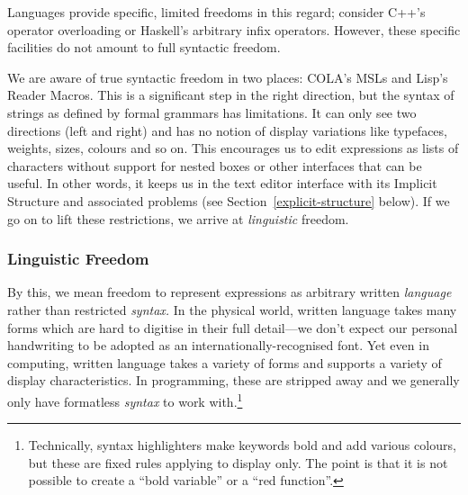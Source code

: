 \documentclass[ twoside,openright,titlepage,numbers=noenddot,headinclude,footinclude,cleardoublepage=empty,abstract=on,
                BCOR=5mm,paper=a4,fontsize=11pt
                ]{scrreprt}
\newcommand{\joel}[1]{}
\theoremstyle{definition}
\begin{document}
\joel{
It could be objected that using `+` instead of `.add()` is already supported in some languages, such as C++ with its operator overloading. We would then point to the `×` Unicode character and ask for a language that permits this infix operator. We might be met with Haskell, famous for its arbitrary user-defined infix operators that may include Unicode symbols. In this case we would point at the juxtaposition of the two parts of the first term to denote multiplication. Are there any languages that permit overloading of whitespace as an infix operator? Supposing there were, there would be other cases for other problem domains where piecemeal allowances in what can be overloaded is not enough. Custom glyphs or even the symbols available in \LaTeX{} but not in Unicode could suffice as an example, but we will not belabour this further.}

Languages provide specific, limited freedoms in this regard; consider
C++'s operator overloading or Haskell's arbitrary infix operators.
However, these specific facilities do not amount to full syntactic
freedom.

We are aware of true syntactic freedom in two places: \ac{COLA}'s
\acfp{MSL} and Lisp's Reader Macros. This is a significant step in the
right direction, but the syntax of strings as defined by formal grammars
has limitations. It can only see two directions (left and right) and has
no notion of display variations like typefaces, weights, sizes, colours
and so on. This encourages us to edit expressions as lists of characters
without support for nested boxes or other interfaces that can be useful.
In other words, it keeps us in the text editor interface with its
Implicit Structure and associated problems (see
Section~\ref{explicit-structure} below). If we go on to lift these
restrictions, we arrive at \emph{linguistic} freedom.

\hypertarget{linguistic-freedom}{\subsubsection{Linguistic Freedom}\label{linguistic-freedom}}

By this, we mean freedom to represent expressions as arbitrary written
\emph{language} rather than restricted \emph{syntax.} In the physical
world, written language takes many forms which are hard to digitise in
their full detail---we don't expect our personal handwriting to be
adopted as an internationally-recognised font. Yet even in computing,
written language takes a variety of forms and supports a variety of
display characteristics. In programming, these are stripped away and we
generally only have formatless \emph{syntax} to work with.\footnote{Technically,
  syntax highlighters make keywords bold and add various colours, but
  these are fixed rules applying to display only. The point is that it
  is not possible to create a ``bold variable'' or a ``red function''.}
\end{document}
